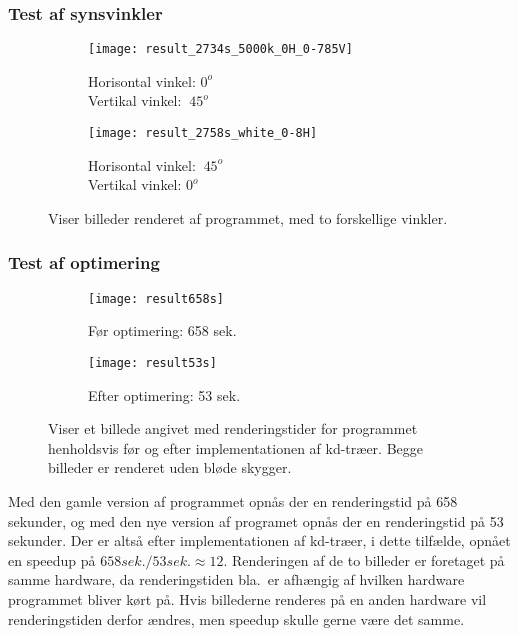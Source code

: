 \subsubsection{Test af synsvinkler}
\begin{figure}[H]
\centering
\begin{subfigure}{.5\textwidth}
  \centering
  \texttt{[image: result\_2734s\_5000k\_0H\_0-785V]}
  \caption{Horisontal vinkel: $0^o$ \\ Vertikal vinkel: $~45^o$}
  \label{fig:one}
\end{subfigure}%
\begin{subfigure}{.5\textwidth}
  \centering
  \texttt{[image: result\_2758s\_white\_0-8H]}
  \caption{Horisontal vinkel: $~45^o$ \\ Vertikal vinkel: $0^o$}
  \label{fig:two}
\end{subfigure}
\caption{Viser billeder renderet af programmet, med to forskellige vinkler.}
\label{fig:synsvinkel}
\end{figure}

\subsubsection{Test af optimering}
\begin{figure}[H]
\centering
\begin{subfigure}{.5\textwidth}
  \centering
  \texttt{[image: result658s]}
  \caption{Før optimering: 658 sek.}
  \label{fig:slow}
\end{subfigure}%
\begin{subfigure}{.5\textwidth}
  \centering
  \texttt{[image: result53s]}
  \caption{Efter optimering: 53 sek.}
  \label{fig:fast}
\end{subfigure}
\caption{Viser et billede angivet med renderingstider for programmet henholdsvis før og efter implementationen af kd-træer. Begge billeder er renderet uden bløde skygger.}
\label{fig:optimering}
\end{figure}

Med den gamle version af programmet opnås der en renderingstid på 658 sekunder, og med den nye version af programet opnås der en renderingstid på 53 sekunder. Der er altså efter implementationen af kd-træer, i dette tilfælde, opnået en speedup på $658 sek./53 sek. \approx 12$. Renderingen af de to billeder er foretaget på samme hardware, da renderingstiden bla.\ er afhængig af hvilken hardware programmet bliver kørt på. Hvis billederne renderes på en anden hardware vil renderingstiden derfor ændres, men speedup skulle gerne være det samme. 

